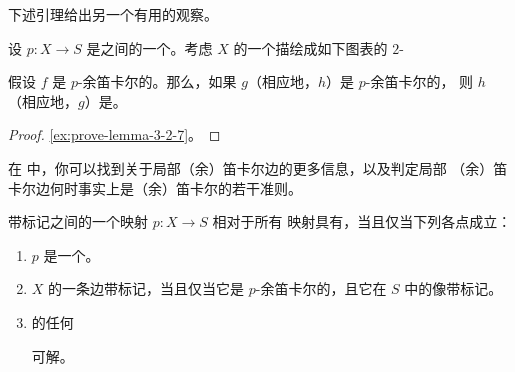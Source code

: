 下述引理给出另一个有用的观察。

\begin{lemma}\label{lem:locally-cocartesian-two-out-of-three}
设 $p\colon X \to S$ 是\trSimplicialSet{}之间的一个\trInnerFibration{}。考虑 $X$
的一个描绘成如下图表的 $2$-\trSimplex{}%
\begin{center}
\end{center}
假设 $f$ 是 $p$-余笛卡尔的。那么，如果 $g$（相应地，$h$）是 $p$-余笛卡尔的，
则 $h$（相应地，$g$）是\trLocallyCocartesian。
\end{lemma}

\begin{proof}
\cref{ex:prove-lemma-3-2-7}。
\end{proof}

\begin{remark}\label{rem:rezk-locally-cocartesian}
在 \cite{Rez19} 中，你可以找到关于局部（余）笛卡尔边的更多信息，以及判定局部%
（余）笛卡尔边何时事实上是（余）笛卡尔的若干准则。
\end{remark}

\begin{proposition}\label{prop:marked-rlp-characterization}
带标记\trSimplicialSet{}之间的一个映射 $p\colon X \to S$ 相对于所有%
\trMarkedLeftAnodyne{}映射具有\trRightLiftingProperty{}，当且仅当下列各点成立：
\begin{enumerate}[label=(\arabic*)]
  \item $p$ 是一个\trInnerFibration{}。
  \item $X$ 的一条边带标记，当且仅当它是 $p$-余笛卡尔的，且它在 $S$ 中的像带标记。
  \item \trMarkedSimplicialSet{}的任何\trLiftingProblem{}%
\begin{center}
\end{center}
        可解。
\end{enumerate}
\end{proposition}

